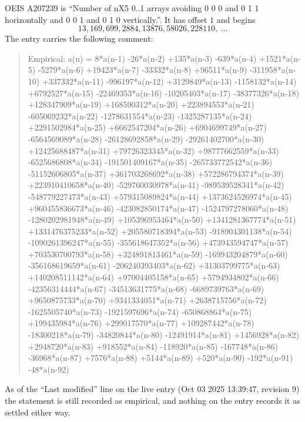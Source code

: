 \documentclass[11pt,a4paper]{article}
\theoremstyle{plain}
\theoremstyle{definition}
\begin{document}
OEIS A207239 is ``Number of nX5 0..1 arrays avoiding 0 0 0 and 0 1 1 horizontally and 0 0 1 and 0 1 0 vertically.''. It has offset
$1$ and begins
\[
13, 169, 699, 2884, 13876, 58026, 228110,\ \dots
\]
The entry carries the following comment:
\begin{quote}\small
Empirical: a(n) = 8*a(n-1) -26*a(n-2) +135*a(n-3) -639*a(n-4) +1521*a(n-5) -5279*a(n-6) +19423*a(n-7) -33332*a(n-8) +96511*a(n-9) -311958*a(n-10) +337332*a(n-11) -996197*a(n-12) +3129849*a(n-13) -1158132*a(n-14) +6792527*a(n-15) -22469353*a(n-16) -10205403*a(n-17) -38377326*a(n-18) +128347909*a(n-19) +168590312*a(n-20) +223894553*a(n-21) -605069232*a(n-22) -1278631554*a(n-23) -1325287135*a(n-24) +2291502984*a(n-25) +6662547204*a(n-26) +6904699749*a(n-27) -6564569089*a(n-28) -26128692858*a(n-29) -29261402700*a(n-30) +12425688487*a(n-31) +79726323345*a(n-32) +98777662559*a(n-33) -6525686808*a(n-34) -191501409167*a(n-35) -265733772542*a(n-36) -51152606805*a(n-37) +361703268692*a(n-38) +572286794374*a(n-39) +223910410658*a(n-40) -529760030978*a(n-41) -989539528341*a(n-42) -548779227473*a(n-43) +579315089824*a(n-44) +1373624526974*a(n-45) +960455836673*a(n-46) -423082850174*a(n-47) -1524797278060*a(n-48) -1280202981948*a(n-49) +105396953464*a(n-50) +1341281367774*a(n-51) +1331476375233*a(n-52) +205580718394*a(n-53) -918904301138*a(n-54) -1090261396247*a(n-55) -355618647352*a(n-56) +473943594747*a(n-57) +703530700793*a(n-58) +324891813461*a(n-59) -169943204879*a(n-60) -356168619659*a(n-61) -206240393403*a(n-62) +31303799775*a(n-63) +140208511142*a(n-64) +97004405158*a(n-65) +5794934802*a(n-66) -42356314444*a(n-67) -34513631775*a(n-68) -6689739763*a(n-69) +9650875733*a(n-70) +9341334051*a(n-71) +2638715756*a(n-72) -1625505740*a(n-73) -1921597696*a(n-74) -650868864*a(n-75) +199435984*a(n-76) +299017570*a(n-77) +109287442*a(n-78) -18300218*a(n-79) -34820844*a(n-80) -12491914*a(n-81) +1456928*a(n-82) +2948720*a(n-83) +918552*a(n-84) -118920*a(n-85) -167748*a(n-86) -36968*a(n-87) +7576*a(n-88) +5144*a(n-89) +520*a(n-90) -192*a(n-91) -48*a(n-92)
\end{quote}
As of the ``Last modified'' line on the live entry (Oct 03 2025 13:39:47, revision
9) the statement is still recorded as empirical, and nothing on the entry
records it as settled either way.
\end{document}
